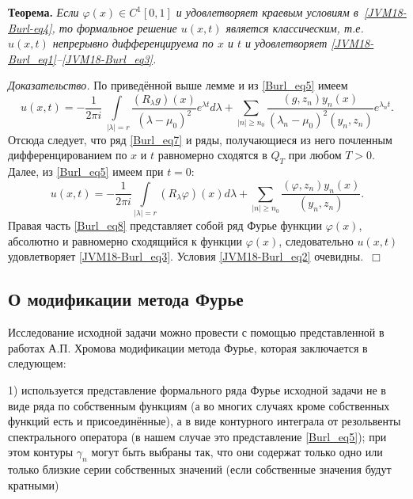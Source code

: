{\bf Теорема. } {\it  Если $\varphi (x)\in C^1[0,1]$ и удовлетворяет
краевым условиям в~\eqref{JVM18-Burl-eq4}, то формальное решение
$u(x,t)$ является классическим, т.е. $u(x,t)$ непрерывно
дифференцируема по $x$ и $t$ и удовлетворяет
\eqref{JVM18-Burl_eq1}--\eqref{JVM18-Burl_eq3}. }

 \textsl{
Доказательство.}
 По приведённой выше лемме и   из \eqref{Burl_eq5}
имеем
\begin{equation}\label{Burl_eq7}
    u(x,t)=-\frac1{2\pi i}\!\!\int\limits_{\,\,|\lambda |=r}\!\!\! \frac{(R_{\lambda}g) (x)}{(\lambda-\mu_0)^2}{{e}^{\lambda t}
  }d\lambda +\!\! \sum_{|n|\geqslant n_0}
 \frac{(g
 ,{{z}_{n}})y_n(x)}{(\lambda_n-\mu_0)^2({{y}_{n}},{{z}_{n}})}e^{\lambda_nt}.
\end{equation}
Отсюда следует, что ряд \eqref{Burl_eq7} и ряды, получающиеся из
него почленным дифференцированием по $x$ и $t$ равномерно сходятся в
$Q_T$ при любом $T>0$. Далее, из  \eqref{Burl_eq5} имеем при $t=0$:
\begin{equation}\label{Burl_eq8}
 u(x,t)=-\frac1{2\pi i}\int\limits_{|\lambda |=r} (R_{\lambda}\varphi)
 (x)d\lambda + \sum_{|n|\geqslant n_0}
 \frac{(\varphi
 ,{{z}_{n}})y_n(x)}{ ({{y}_{n}},{{z}_{n}})}.
\end{equation}
Правая часть \eqref{Burl_eq8} представляет собой ряд Фурье функции
$\varphi(x)$, абсолютно и равномерно сходящийся к функции
$\varphi(x)$, следовательно $u(x,t)$ удовлетворяет
\eqref{JVM18-Burl_eq3}. Условия \eqref{JVM18-Burl_eq2}
очевидны.~$\Box$







\subsection{ О модификации метода Фурье}

Исследование исходной задачи можно провести с помощью представленной
в работах А.П. Хромова \cite{Kh1,Kh2}  модификации метода Фурье,
которая заключается в следующем:

1) используется представление формального ряда Фурье исходной задачи
не в виде ряда по собственным функциям (а во многих случаях кроме
собственных функций есть и присоединённые), а в виде контурного
интеграла от резольвенты спектрального оператора (в нашем случае это
представление \eqref{Burl_eq5}); при этом контуры ${\gamma }_{n}$
могут быть выбраны так, что они содержат только одно или только
близкие серии собственных значений (если собственные значения будут
кратными)

